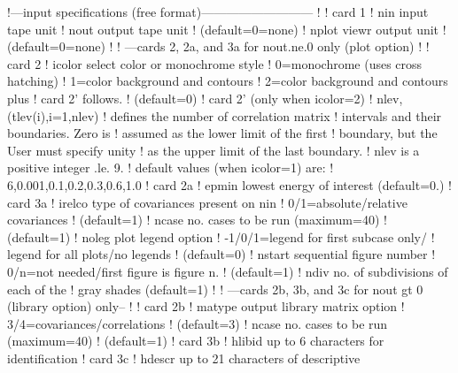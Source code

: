 \small
\begin{ccode}

   !---input specifications (free format)---------------------------
   !
   !  card 1
   !     nin            input tape unit
   !     nout           output tape unit
   !                    (default=0=none)
   !     nplot          viewr output unit
   !                    (default=0=none)
   !
   !   ---cards 2, 2a, and 3a for nout.ne.0 only (plot option)
   !
   !  card 2
   !     icolor          select color or monochrome style
   !                       0=monochrome (uses cross hatching)
   !                       1=color background and contours
   !                       2=color background and contours plus
   !                         card 2' follows.
   !                       (default=0)
   !  card 2' (only when icolor=2)
   !     nlev,(tlev(i),i=1,nlev)
   !                     defines the number of correlation matrix
   !                     intervals and their boundaries.  Zero is
   !                     assumed as the lower limit of the first
   !                     boundary, but the User must specify unity
   !                     as the upper limit of the last boundary.
   !                     nlev is a positive integer .le. 9.
   !                     default values (when icolor=1) are:
   !                       6,0.001,0.1,0.2,0.3,0.6,1.0
   !  card 2a
   !     epmin          lowest energy of interest (default=0.)
   !  card 3a
   !     irelco         type of covariances present on nin
   !                    0/1=absolute/relative covariances
   !                    (default=1)
   !     ncase          no. cases to be run (maximum=40)
   !                    (default=1)
   !     noleg          plot legend option
   !                    -1/0/1=legend for first subcase only/
   !                    legend for all plots/no legends
   !                    (default=0)
   !     nstart         sequential figure number
   !                    0/n=not needed/first figure is figure n.
   !                    (default=1)
   !     ndiv           no. of subdivisions of each of the
   !                    gray shades (default=1)
   !
   !   ---cards 2b, 3b, and 3c for nout gt 0 (library option) only--
   !
   !  card 2b
   !     matype         output library matrix option
   !                    3/4=covariances/correlations
   !                    (default=3)
   !     ncase          no. cases to be run (maximum=40)
   !                    (default=1)
   !  card 3b
   !     hlibid         up to 6 characters for identification
   !  card 3c
   !     hdescr         up to 21 characters of descriptive

\end{ccode}
